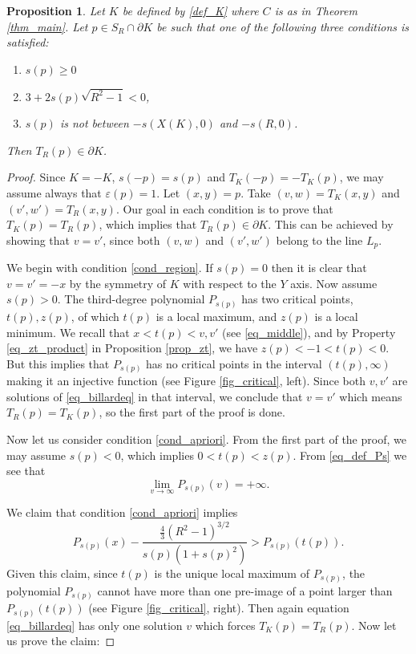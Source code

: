 \documentclass{amsart}
\def \e{\varepsilon}
\newtheorem{proposition}[theorem]{Proposition}
\begin{document}
\begin{proposition}
	\label{prop_uniqueness_cases}
	Let $K$ be defined by \eqref{def_K} where $C$ is as in Theorem \ref{thm_main}.
	Let $p \in S_R \cap \partial K$ be such that one of the following three conditions is satisfied:
	\begin{enumerate}[label = (\alph*), ref = \alph* ]
		\item \label{cond_region} $s(p) \geq 0$
		\item \label{cond_apriori} $3+2s(p) \sqrt{R^2-1} < 0$,
		\item \label{cond_interval} $s(p)$ is not between $-s(X(K),0)$ and $-s(R,0)$.
	\end{enumerate}
	Then $T_R(p) \in \partial K$.
\end{proposition}
\begin{proof}
	Since $K = -K$, $s(-p) = s(p)$ and $T_K(-p) = - T_K(p)$, we may assume always that $\e(p) = 1$.
	Let $(x,y) = p$.
	Take $(v,w) = T_K(x,y)$ and $(v',w') = T_R(x,y)$.
	Our goal in each condition is to prove that $T_K(p) = T_R(p)$, which implies that $T_R(p) \in \partial K$.
	This can be achieved by showing that $v = v'$, since both $(v,w)$ and $(v',w')$ belong to the line $L_p$.

	We begin with condition \eqref{cond_region}.
	If $s(p) = 0$ then it is clear that $v = v' = -x$ by the symmetry of $K$ with respect to the $Y$ axis.
	Now assume $s(p) > 0$.
	The third-degree polynomial $P_{s(p)}$ has two critical points, $t(p), z(p)$, of which $t(p)$ is a local maximum, and $z(p)$ is a local minimum.
	We recall that $x < t(p) < v,v'$ (see \eqref{eq_middle}), and by Property \eqref{eq_zt_product} in Proposition \ref{prop_zt}, we have $z(p) < -1 < t(p) <  0$.
	But this implies that $P_{s(p)}$ has no critical points in the interval $(t(p), \infty)$ making it an injective function (see Figure \ref{fig_critical}, left).
	Since both $v,v'$ are solutions of \eqref{eq_billardeq} in that interval, we conclude that $v=v'$ which means $T_R(p) = T_K(p)$, so the first part of the proof is done.

	Now let us consider condition \eqref{cond_apriori}.
	From the first part of the proof, we may assume $s(p) < 0$, which implies $0 < t(p) < z(p)$. From \eqref{eq_def_Ps} we see that
	\[\lim_{v \to \infty} P_{s(p)} (v) = +\infty.\]

	We claim that condition \eqref{cond_apriori} implies 
	\begin{equation}
		\label{eq_uniqueness_condition}
		P_{s(p)} (x) - \frac{\frac 43 (R^2-1)^{3/2}}{s(p)(1+s(p)^2)} > P_{s(p)} (t(p)).
	\end{equation}
	Given this claim, since $t(p)$ is the unique local maximum of $P_{s(p)} $, the polynomial $P_{s(p)} $ cannot have more than one pre-image of a point larger than $P_{s(p)} (t(p))$ (see Figure \ref{fig_critical}, right).
	Then again equation \eqref{eq_billardeq} has only one solution $v$ which forces $T_K(p) = T_R(p)$.
	Now let us prove the claim:


\end{proof}
\end{document}
